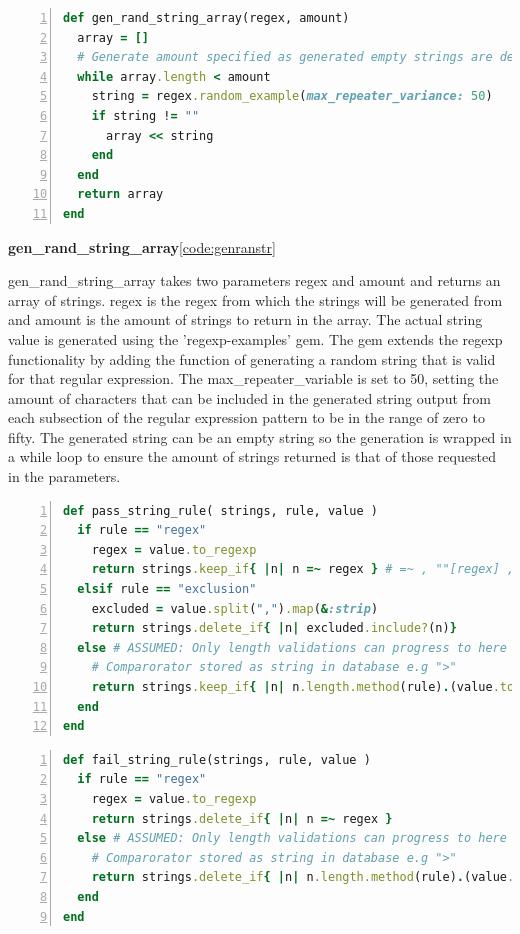 \documentclass[a4paper,12pt]{article}
\begin{document}
\begin{lstlisting}[frame=single,numbers=left,language = ruby,caption= {gen\_rand\_string\_array}, label={code:genranstr}]
def gen_rand_string_array(regex, amount)
  array = []
  # Generate amount specified as generated empty strings are deleted
  while array.length < amount
    string = regex.random_example(max_repeater_variance: 50)
    if string != ""
      array << string
    end
  end
  return array
end
\end{lstlisting}

\par \textbf{gen\_rand\_string\_array}\ref{code:genranstr}
\par gen\_rand\_string\_array takes two parameters regex and amount and returns an array of strings. regex is the regex from which the strings will be generated from and amount is the amount of strings to return in the array. The actual string value is generated using the 'regexp-examples'\cite{regexprangem} gem. The gem extends the regexp functionality by adding the function of generating a random string that is valid for that regular expression. The max\_repeater\_variable is set to 50, setting the amount of characters that can be included in the generated string output from each subsection of the regular expression pattern to be in the range of zero to fifty. The generated string can be an empty string so the generation is wrapped in a while loop to ensure the amount of strings returned is that of those requested in the parameters.

\begin{lstlisting}[frame=single,numbers=left,language = ruby,caption= {pass\_string\_rule}, label={code:passstrrule}]
def pass_string_rule( strings, rule, value )
  if rule == "regex"
    regex = value.to_regexp
    return strings.keep_if{ |n| n =~ regex } # =~ , ""[regex] , "".match(regex) #ATTN TIMINGS
  elsif rule == "exclusion"
    excluded = value.split(",").map(&:strip)
    return strings.delete_if{ |n| excluded.include?(n)}
  else # ASSUMED: Only length validations can progress to here
    # Comparorator stored as string in database e.g ">"
    return strings.keep_if{ |n| n.length.method(rule).(value.to_i)}
  end
end
\end{lstlisting}

\begin{lstlisting}[frame=single,numbers=left,language = ruby,caption= {fail\_string\_rule}, label={code:failstrrule}]
def fail_string_rule(strings, rule, value )
  if rule == "regex"
    regex = value.to_regexp
    return strings.delete_if{ |n| n =~ regex }
  else # ASSUMED: Only length validations can progress to here
    # Comparorator stored as string in database e.g ">"
    return strings.delete_if{ |n| n.length.method(rule).(value.to_i)}
  end
end
\end{lstlisting}
\end{document}
